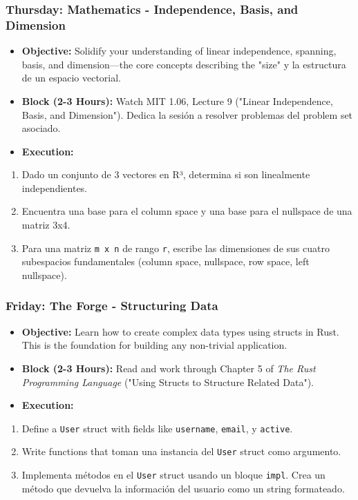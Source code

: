\subsubsection{\textbf{Thursday: Mathematics - Independence, Basis, and Dimension}}
\begin{itemize}
  \item \textbf{Objective:} Solidify your understanding of linear independence, spanning, basis, and dimension—the core concepts describing the "size" y la estructura de un espacio vectorial.
  \item \textbf{Block (2-3 Hours):} Watch MIT 1.06, Lecture 9 ("Linear Independence, Basis, and Dimension"). Dedica la sesión a resolver problemas del problem set asociado.
  \item \textbf{Execution:}
\end{itemize}
\begin{enumerate}
  \item Dado un conjunto de 3 vectores en R³, determina si son linealmente independientes.
  \item Encuentra una base para el column space y una base para el nullspace de una matriz 3x4.
  \item Para una matriz \texttt{m x n} de rango \texttt{r}, escribe las dimensiones de sus cuatro subespacios fundamentales (column space, nullspace, row space, left nullspace).

\end{enumerate}
\subsubsection{\textbf{Friday: The Forge - Structuring Data}}
\begin{itemize}
  \item \textbf{Objective:} Learn how to create complex data types using structs in Rust. This is the foundation for building any non-trivial application.
  \item \textbf{Block (2-3 Hours):} Read and work through Chapter 5 of \textit{The Rust Programming Language} ("Using Structs to Structure Related Data").
  \item \textbf{Execution:}
\end{itemize}
\begin{enumerate}
  \item Define a \texttt{User} struct with fields like \texttt{username}, \texttt{email}, y \texttt{active}.
  \item Write functions that toman una instancia del \texttt{User} struct como argumento.
  \item Implementa métodos en el \texttt{User} struct usando un bloque \texttt{impl}. Crea un método que devuelva la información del usuario como un string formateado.

\end{enumerate}
